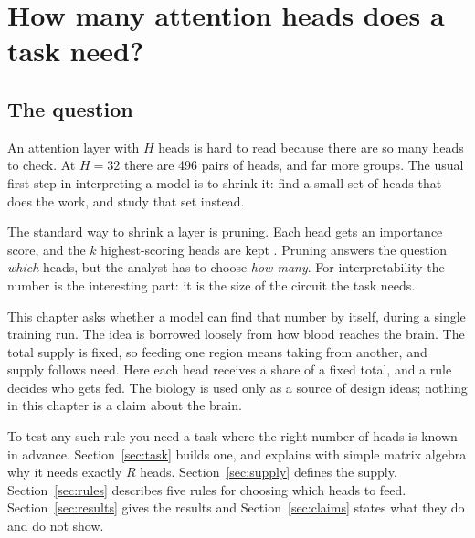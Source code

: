 \documentclass[11pt]{report}
\begin{document}
\chapter{How many attention heads does a task need?}

\section{The question}

An attention layer with $H$ heads is hard to read because there are so many heads to
check. At $H = 32$ there are 496 pairs of heads, and far more groups. The usual first step
in interpreting a model is to shrink it: find a small set of heads that does the work, and
study that set instead.

The standard way to shrink a layer is pruning. Each head gets an importance score, and
the $k$ highest-scoring heads are kept \cite{michel2019,voita2019}. Pruning answers the
question \emph{which} heads, but the analyst has to choose \emph{how many}. For
interpretability the number is the interesting part: it is the size of the circuit the
task needs.

This chapter asks whether a model can find that number by itself, during a single training
run. The idea is borrowed loosely from how blood reaches the brain. The total supply is
fixed, so feeding one region means taking from another, and supply follows need. Here
each head receives a share of a fixed total, and a rule decides who gets fed. The biology
is used only as a source of design ideas; nothing in this chapter is a claim about the
brain.

To test any such rule you need a task where the right number of heads is known in
advance. Section~\ref{sec:task} builds one, and explains with simple matrix algebra why it
needs exactly $R$ heads. Section~\ref{sec:supply} defines the supply. Section~\ref{sec:rules}
describes five rules for choosing which heads to feed. Section~\ref{sec:results} gives the
results and Section~\ref{sec:claims} states what they do and do not show.
\end{document}
